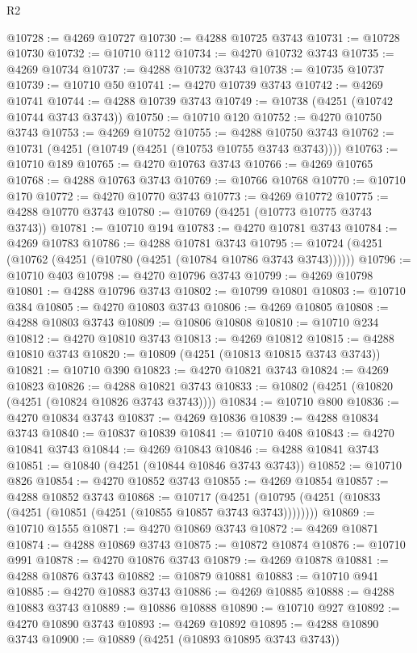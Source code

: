 \begin{lexlean}{R2}
\begin{coremodule}
@10728 := @4269 @10727
@10730 := @4288 @10725 @3743
@10731 := @10728 @10730
@10732 := @10710 @112
@10734 := @4270 @10732 @3743
@10735 := @4269 @10734
@10737 := @4288 @10732 @3743
@10738 := @10735 @10737
@10739 := @10710 @50
@10741 := @4270 @10739 @3743
@10742 := @4269 @10741
@10744 := @4288 @10739 @3743
@10749 := @10738 (@4251 (@10742 @10744 @3743 @3743))
@10750 := @10710 @120
@10752 := @4270 @10750 @3743
@10753 := @4269 @10752
@10755 := @4288 @10750 @3743
@10762 := @10731 (@4251 (@10749 (@4251 (@10753 @10755 @3743 @3743))))
@10763 := @10710 @189
@10765 := @4270 @10763 @3743
@10766 := @4269 @10765
@10768 := @4288 @10763 @3743
@10769 := @10766 @10768
@10770 := @10710 @170
@10772 := @4270 @10770 @3743
@10773 := @4269 @10772
@10775 := @4288 @10770 @3743
@10780 := @10769 (@4251 (@10773 @10775 @3743 @3743))
@10781 := @10710 @194
@10783 := @4270 @10781 @3743
@10784 := @4269 @10783
@10786 := @4288 @10781 @3743
@10795 := @10724 (@4251 (@10762 (@4251 (@10780 (@4251 (@10784 @10786 @3743 @3743))))))
@10796 := @10710 @403
@10798 := @4270 @10796 @3743
@10799 := @4269 @10798
@10801 := @4288 @10796 @3743
@10802 := @10799 @10801
@10803 := @10710 @384
@10805 := @4270 @10803 @3743
@10806 := @4269 @10805
@10808 := @4288 @10803 @3743
@10809 := @10806 @10808
@10810 := @10710 @234
@10812 := @4270 @10810 @3743
@10813 := @4269 @10812
@10815 := @4288 @10810 @3743
@10820 := @10809 (@4251 (@10813 @10815 @3743 @3743))
@10821 := @10710 @390
@10823 := @4270 @10821 @3743
@10824 := @4269 @10823
@10826 := @4288 @10821 @3743
@10833 := @10802 (@4251 (@10820 (@4251 (@10824 @10826 @3743 @3743))))
@10834 := @10710 @800
@10836 := @4270 @10834 @3743
@10837 := @4269 @10836
@10839 := @4288 @10834 @3743
@10840 := @10837 @10839
@10841 := @10710 @408
@10843 := @4270 @10841 @3743
@10844 := @4269 @10843
@10846 := @4288 @10841 @3743
@10851 := @10840 (@4251 (@10844 @10846 @3743 @3743))
@10852 := @10710 @826
@10854 := @4270 @10852 @3743
@10855 := @4269 @10854
@10857 := @4288 @10852 @3743
@10868 := @10717
    (@4251 (@10795 (@4251 (@10833 (@4251 (@10851 (@4251 (@10855 @10857 @3743 @3743))))))))
@10869 := @10710 @1555
@10871 := @4270 @10869 @3743
@10872 := @4269 @10871
@10874 := @4288 @10869 @3743
@10875 := @10872 @10874
@10876 := @10710 @991
@10878 := @4270 @10876 @3743
@10879 := @4269 @10878
@10881 := @4288 @10876 @3743
@10882 := @10879 @10881
@10883 := @10710 @941
@10885 := @4270 @10883 @3743
@10886 := @4269 @10885
@10888 := @4288 @10883 @3743
@10889 := @10886 @10888
@10890 := @10710 @927
@10892 := @4270 @10890 @3743
@10893 := @4269 @10892
@10895 := @4288 @10890 @3743
@10900 := @10889 (@4251 (@10893 @10895 @3743 @3743))

\end{coremodule}
\end{lexlean}
